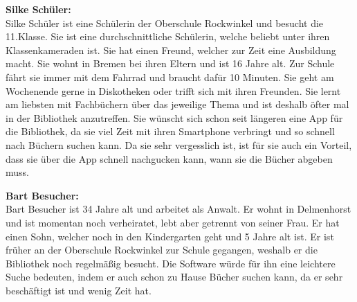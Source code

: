 \documentclass[fontsize=12pt,paper=a4,twoside]{scrartcl}
\begin{document}
\textbf{Silke Schüler:}\\
Silke Schüler ist eine Schülerin der Oberschule Rockwinkel und besucht die 11.Klasse. Sie ist eine durchschnittliche Schülerin, welche beliebt unter ihren Klassenkameraden ist. Sie hat einen Freund, welcher zur Zeit eine Ausbildung macht. Sie wohnt in Bremen bei ihren Eltern und ist 16 Jahre alt. Zur Schule fährt sie immer mit dem Fahrrad und braucht dafür 10 Minuten. Sie geht am Wochenende gerne in Diskotheken oder trifft sich mit ihren Freunden. Sie lernt am liebsten mit Fachbüchern über das jeweilige Thema und ist deshalb öfter mal in der Bibliothek anzutreffen. Sie wünscht sich schon seit längeren eine App für die Bibliothek, da sie viel Zeit mit ihren Smartphone verbringt und so schnell nach Büchern suchen kann. Da sie sehr vergesslich ist, ist für sie auch ein Vorteil, dass sie über die App schnell nachgucken kann, wann sie die Bücher abgeben muss.

\textbf{Bart Besucher:}\\
Bart Besucher ist 34 Jahre alt und arbeitet als Anwalt. Er wohnt in Delmenhorst und ist momentan noch verheiratet, lebt aber getrennt von seiner Frau. Er hat einen Sohn, welcher noch in den Kindergarten geht und 5 Jahre alt ist. Er ist früher an der Oberschule Rockwinkel zur Schule gegangen, weshalb er die Bibliothek noch regelmäßig besucht. Die Software würde für ihn eine leichtere Suche bedeuten, indem er auch schon zu Hause Bücher suchen kann, da er sehr beschäftigt ist und wenig Zeit hat.
\end{document}
